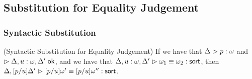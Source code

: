 \subsection{Substitution for Equality Judgement}

\subsubsection{Syntactic Substitution}

\begin{lemma}{(Syntactic Substitution for Equality Judgement)}
If we have that $\judgeA{p}{\omega}$ and $\judgeACtx{\Delta, u:\omega, \Delta'}$, and we have that 
$\judgeSortEq[{\Delta, u:\omega, \Delta'}]{\omega_1}{\omega_2}$, 
then $\judgeSortEq[{\Delta, [p/u]\Delta'}]{[p/u]\omega'}{[p/u]\omega''}$. 
\end{lemma}

